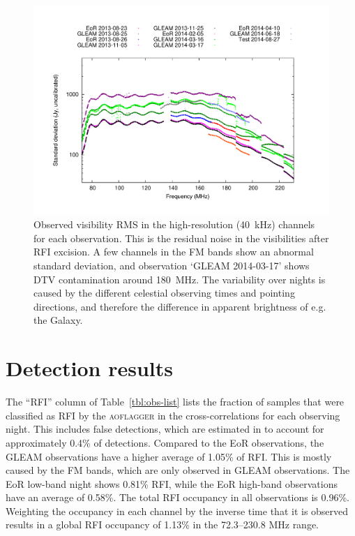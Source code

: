 \documentclass{pasa}
\begin{document}
\noindent\begin{figure}
\begin{center}\hspace*{-0.2cm}\includegraphics[width=18cm]{img/plot-stddev-per-set}\vspace{-1cm}
\caption{Observed visibility RMS in the high-resolution (40~kHz) channels for each observation. This is the residual noise in the visibilities after RFI excision. A few channels in the FM bands show an abnormal standard deviation, and observation `GLEAM 2014-03-17' shows DTV contamination around 180~MHz. The variability over nights is caused by the different celestial observing times and pointing directions, and therefore the difference in apparent brightness of e.g. the Galaxy.}
\label{fig:stddev-per-set}
\end{center}
\end{figure}

\section{Detection results} \label{ch:detection-results}
The ``RFI'' column of Table~\ref{tbl:obs-list} lists the fraction of samples that were classified as RFI by the \textsc{aoflagger} in the cross-correlations for each observing night. This includes false detections, which are estimated in \citet{lofar-radio-environment} to account for approximately 0.4\% of detections. Compared to the EoR observations, the GLEAM observations have a higher average of 1.05\% of RFI. This is mostly caused by the FM bands, which are only observed in GLEAM observations. The EoR low-band night shows 0.81\% RFI, while the EoR high-band observations have an average of 0.58\%. The total RFI occupancy in all observations is 0.96\%. Weighting the occupancy in each channel by the inverse time that it is observed results in a global RFI occupancy of 1.13\% in the 72.3--230.8 MHz range.
\end{document}
